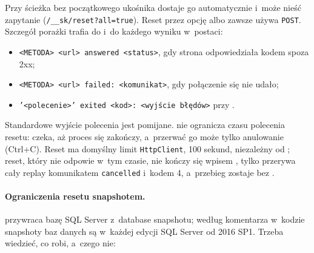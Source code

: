 Przy  ścieżka bez początkowego ukośnika dostaje go automatycznie i~może
nieść zapytanie (\texttt{/\_\_sk/reset?all=true}). Reset przez opcję
 albo  zawsze używa
\texttt{POST}. Szczegół porażki trafia do  i~do każdego wyniku
 w~postaci:
\begin{itemize}
  \item \texttt{<METODA> <url> answered <status>}, gdy strona odpowiedziała kodem spoza
        2xx;
  \item \texttt{<METODA> <url> failed: <komunikat>}, gdy połączenie się nie udało;
  \item \texttt{'<polecenie>' exited <kod>: <wyjście błędów>} przy .
\end{itemize}
Standardowe wyjście polecenia jest pomijane.  nie ogranicza czasu polecenia
resetu: czeka, aż proces się zakończy, a~przerwać go może tylko anulowanie (Ctrl+C). Reset
 ma domyślny limit \texttt{HttpClient}, 100 sekund, niezależny od
; reset, który nie odpowie w~tym czasie, nie kończy się wpisem
, tylko przerywa cały replay komunikatem \texttt{cancelled}
i~kodem 4, a~przebieg zostaje bez .

\paragraph{Ograniczenia resetu snapshotem.}  przywraca bazę SQL
Server z~database snapshotu; według komentarza w~kodzie snapshoty baz danych są w~każdej
edycji SQL Server od 2016 SP1. Trzeba wiedzieć, co robi, a~czego nie:

